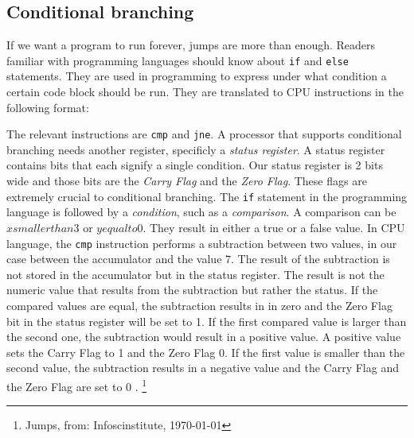 \subsection{Conditional branching}

If we want a program to run forever, jumps are more than enough. Readers familiar with programming languages should know about \texttt{if} and \texttt{else} statements. They are used in programming to express
under what condition a certain code block should be run. They are translated to CPU instructions
in the following format:
\newline
\bigskip
\raggedright
The relevant instructions are \texttt{cmp} and \texttt{jne}. A processor that supports conditional branching needs
another register, specificly a \textit{status register}. A status register contains bits that each signify
a single condition. Our status register is 2 bits wide and those bits are the \textit{Carry Flag} and
the \textit{Zero Flag}. These flags are extremely crucial to conditional branching. The \texttt{if} statement
in the programming language is followed by a \textit{condition}, such as a \textit{comparison}. A comparison
can be $x smaller than 3$ or $y equal to 0$. They result in either a true or a false value. In 
CPU language, the \texttt{cmp} instruction performs a subtraction between two values, in our case between
the accumulator and the value 7. The result of the subtraction is not stored in the accumulator
but in the status register. The result is not the numeric value that results from the subtraction 
but rather the status. If the compared values are equal, the subtraction results in in zero and the
Zero Flag bit in the status register will be set to 1. If the first compared value is larger than the second one, the subtraction would result in a positive value. A positive value sets the
Carry Flag to 1 and the Zero Flag 0.
If the first value is smaller than the second value, the subtraction results in a negative value and
the Carry Flag and the Zero Flag are set to 0 . \footnote{Jumps, from: Infoscinstitute, \today }



